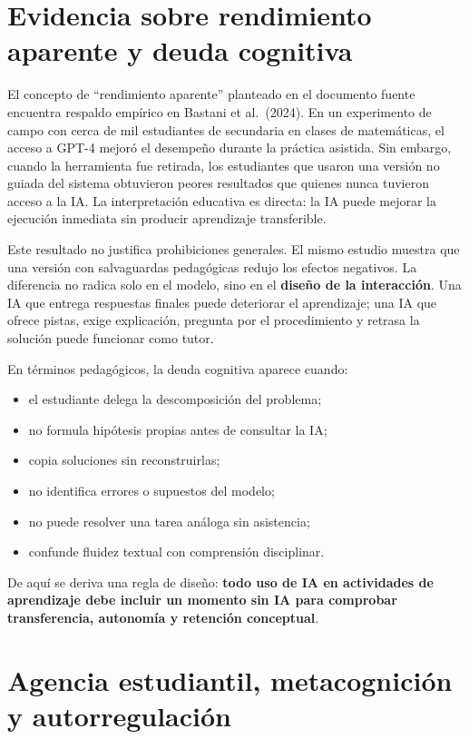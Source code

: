 \documentclass[
  spanish,
  letterpaper,
  DIV=11,
  numbers=noendperiod]{scrartcl}
\providecommand{\tightlist}{%
  \setlength{\itemsep}{0pt}\setlength{\parskip}{0pt}}
\begin{document}
\section{Evidencia sobre rendimiento aparente y deuda
cognitiva}\label{evidencia-sobre-rendimiento-aparente-y-deuda-cognitiva}

El concepto de ``rendimiento aparente'' planteado en el documento fuente
encuentra respaldo empírico en Bastani et al.~(2024). En un experimento
de campo con cerca de mil estudiantes de secundaria en clases de
matemáticas, el acceso a GPT-4 mejoró el desempeño durante la práctica
asistida. Sin embargo, cuando la herramienta fue retirada, los
estudiantes que usaron una versión no guiada del sistema obtuvieron
peores resultados que quienes nunca tuvieron acceso a la IA. La
interpretación educativa es directa: la IA puede mejorar la ejecución
inmediata sin producir aprendizaje transferible.

Este resultado no justifica prohibiciones generales. El mismo estudio
muestra que una versión con salvaguardas pedagógicas redujo los efectos
negativos. La diferencia no radica solo en el modelo, sino en el
\textbf{diseño de la interacción}. Una IA que entrega respuestas finales
puede deteriorar el aprendizaje; una IA que ofrece pistas, exige
explicación, pregunta por el procedimiento y retrasa la solución puede
funcionar como tutor.

En términos pedagógicos, la deuda cognitiva aparece cuando:

\begin{itemize}
\tightlist
\item
  el estudiante delega la descomposición del problema;
\item
  no formula hipótesis propias antes de consultar la IA;
\item
  copia soluciones sin reconstruirlas;
\item
  no identifica errores o supuestos del modelo;
\item
  no puede resolver una tarea análoga sin asistencia;
\item
  confunde fluidez textual con comprensión disciplinar.
\end{itemize}

De aquí se deriva una regla de diseño: \textbf{todo uso de IA en
actividades de aprendizaje debe incluir un momento sin IA para comprobar
transferencia, autonomía y retención conceptual}.

\section{Agencia estudiantil, metacognición y
autorregulación}\label{agencia-estudiantil-metacogniciuxf3n-y-autorregulaciuxf3n}
\end{document}
